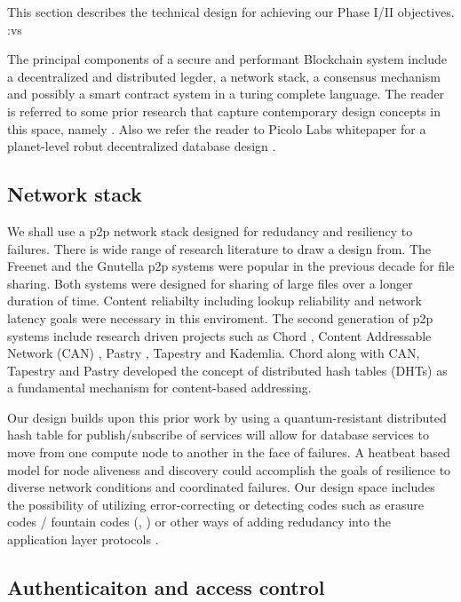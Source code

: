 \label{sec:design}
This section describes the technical design for achieving our Phase I/II objectives. :vs

The principal components of a secure and performant Blockchain system include a decentralized and distributed legder, a
network stack, a consensus mechanism and possibly a smart contract system in a turing complete language. The reader is
referred to some prior research that capture contemporary design concepts in this space, namely \cite{micali16,
garay2015, ava2018}. Also we refer the reader to Picolo Labs whitepaper for a planet-level robut decentralized database
design \cite{picolo2018}.

\subsection{Network stack}

We shall use a p2p network stack designed for redudancy and resiliency to failures. There is wide range of research
literature to draw a design from.  The Freenet \cite{freenet_thesis, Clarke_2001} and the Gnutella \cite{Gnutella} p2p
systems were popular in the previous decade for file sharing. Both systems were designed for sharing of large files over
a longer duration of time. Content reliabilty including lookup reliability and network latency goals were necessary in
this enviroment. The second generation of p2p systems include research driven projects such as Chord \cite{Stoica_2001},
Content Addressable Network (CAN) \cite{Ratnasamy_2001}, Pastry \cite{Rowstron_2001}, Tapestry \cite{tapestry2004} and
Kademlia. Chord along with CAN, Tapestry and Pastry developed the concept of distributed hash tables (DHTs) as a
fundamental mechanism for content-based addressing.

Our design builds upon this prior work by using a quantum-resistant distributed hash table for
publish/subscribe of services will allow for database services to move from one compute node to another in the face of
failures. A heatbeat based model for node aliveness and discovery could accomplish the goals of resilience to diverse
network conditions and coordinated failures. Our design space includes the possibility of utilizing error-correcting or
detecting codes such as erasure codes / fountain codes (\cite{byers1998}, \cite{hu2013}) or other ways of adding
redudancy into the application layer protocols \cite{bloxroute}.

\subsection{Authenticaiton and access control}

